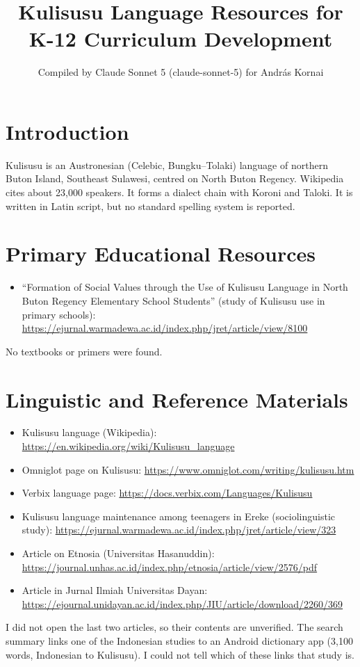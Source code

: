 \documentclass[12pt]{article}
\title{Kulisusu Language Resources for K-12 Curriculum Development}
\author{Compiled by Claude Sonnet 5 (claude-sonnet-5) for Andr\'as Kornai}
\date{}
\begin{document}
\maketitle

\section{Introduction}
Kulisusu is an Austronesian (Celebic, Bungku--Tolaki) language of northern Buton Island, Southeast Sulawesi, centred on North Buton Regency. Wikipedia cites about 23,000 speakers. It forms a dialect chain with Koroni and Taloki. It is written in Latin script, but no standard spelling system is reported.

\section{Primary Educational Resources}
\begin{itemize}
\item ``Formation of Social Values through the Use of Kulisusu Language in North Buton Regency Elementary School Students'' (study of Kulisusu use in primary schools): \url{https://ejurnal.warmadewa.ac.id/index.php/jret/article/view/8100}
\end{itemize}
No textbooks or primers were found.

\section{Linguistic and Reference Materials}
\begin{itemize}
\item Kulisusu language (Wikipedia): \url{https://en.wikipedia.org/wiki/Kulisusu_language}
\item Omniglot page on Kulisusu: \url{https://www.omniglot.com/writing/kulisusu.htm}
\item Verbix language page: \url{https://docs.verbix.com/Languages/Kulisusu}
\item Kulisusu language maintenance among teenagers in Ereke (sociolinguistic study): \url{https://ejurnal.warmadewa.ac.id/index.php/jret/article/view/323}
\item Article on Etnosia (Universitas Hasanuddin): \url{https://journal.unhas.ac.id/index.php/etnosia/article/view/2576/pdf}
\item Article in Jurnal Ilmiah Universitas Dayan: \url{https://ejournal.unidayan.ac.id/index.php/JIU/article/download/2260/369}
\end{itemize}
I did not open the last two articles, so their contents are unverified. The search summary links one of the Indonesian studies to an Android dictionary app (3,100 words, Indonesian to Kulisusu). I could not tell which of these links that study is.
\end{document}

